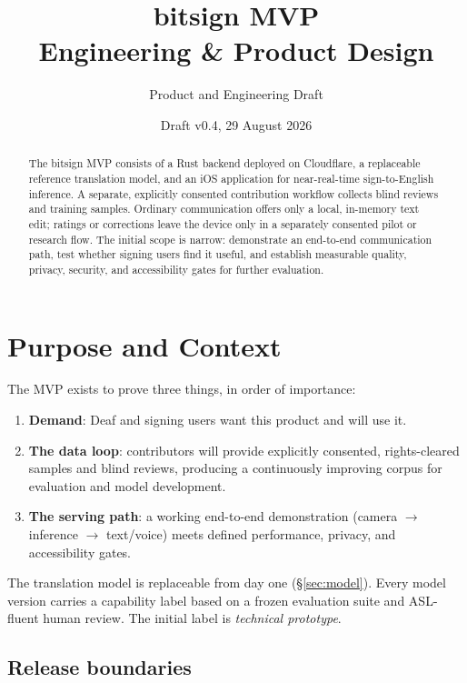 \documentclass[11pt]{article}
\title{\textbf{bitsign MVP} \\ \large Engineering \& Product Design}
\author{Product and Engineering Draft}
\date{Draft v0.4, 29 August 2026}
\begin{document}
\maketitle

\begin{abstract}
\noindent The bitsign MVP consists of a Rust backend deployed on Cloudflare, a
replaceable reference translation model, and an iOS application for near-real-time
sign-to-English inference. A separate, explicitly consented contribution workflow
collects blind reviews and training samples. Ordinary communication offers only a
local, in-memory text edit; ratings or corrections leave the device only in a
separately consented pilot or research flow. The initial scope is narrow:
demonstrate an end-to-end communication path, test whether signing users find it
useful, and establish measurable quality, privacy, security, and accessibility
gates for further evaluation.
\end{abstract}

\tableofcontents

\section{Purpose and Context}

The MVP exists to prove three things, in order of importance:

\begin{enumerate}[nosep]
  \item \textbf{Demand}: Deaf and signing users want this product and will use it.
  \item \textbf{The data loop}: contributors will provide explicitly consented,
        rights-cleared samples and blind reviews, producing a continuously improving
        corpus for evaluation and model development.
  \item \textbf{The serving path}: a working end-to-end demonstration (camera
        $\to$ inference $\to$ text/voice) meets defined performance, privacy, and
        accessibility gates.
\end{enumerate}

The translation model is replaceable from day one (\S\ref{sec:model}). Every model
version carries a capability label based on a frozen evaluation suite and ASL-fluent
human review. The initial label is \emph{technical prototype}.

\subsection{Release boundaries}
\end{document}
